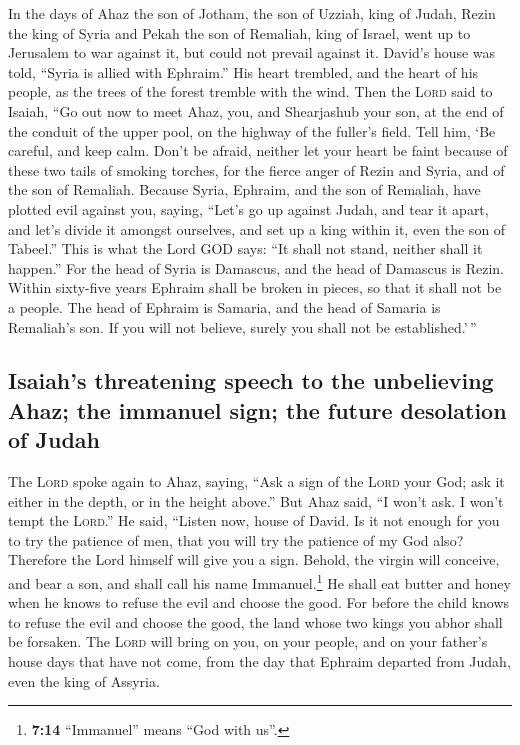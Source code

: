  In the days of Ahaz the son of Jotham, the son of Uzziah,
king of Judah, Rezin the king of Syria and Pekah the son of Remaliah,
king of Israel, went up to Jerusalem to war against it, but could not
prevail against it.  David's house was told, ``Syria is
allied with Ephraim.'' His heart trembled, and the heart of his people,
as the trees of the forest tremble with the wind.  Then
the \textsc{Lord} said to Isaiah, ``Go out now to meet Ahaz, you, and
Shearjashub your son, at the end of the conduit of the upper pool, on
the highway of the fuller's field.  Tell him, `Be careful,
and keep calm. Don't be afraid, neither let your heart be faint because
of these two tails of smoking torches, for the fierce anger of Rezin and
Syria, and of the son of Remaliah.  Because Syria,
Ephraim, and the son of Remaliah, have plotted evil against you, saying,
 ``Let's go up against Judah, and tear it apart, and let's
divide it amongst ourselves, and set up a king within it, even the son
of Tabeel.''  This is what the Lord GOD says: ``It shall
not stand, neither shall it happen.''  For the head of
Syria is Damascus, and the head of Damascus is Rezin. Within sixty-five
years Ephraim shall be broken in pieces, so that it shall not be a
people.  The head of Ephraim is Samaria, and the head of
Samaria is Remaliah's son. If you will not believe, surely you shall not
be established.'\,''

\hypertarget{isaiahs-threatening-speech-to-the-unbelieving-ahaz-the-immanuel-sign-the-future-desolation-of-judah}{%
\subsection{Isaiah's threatening speech to the unbelieving Ahaz; the
immanuel sign; the future desolation of
Judah}\label{isaiahs-threatening-speech-to-the-unbelieving-ahaz-the-immanuel-sign-the-future-desolation-of-judah}}

 The \textsc{Lord} spoke again to Ahaz, saying,
 ``Ask a sign of the \textsc{Lord} your God; ask it
either in the depth, or in the height above.''  But Ahaz
said, ``I won't ask. I won't tempt the \textsc{Lord}.'' 
He said, ``Listen now, house of David. Is it not enough for you to try
the patience of men, that you will try the patience of my God also?
 Therefore the Lord himself will give you a sign. Behold,
the virgin will conceive, and bear a son, and shall call his name
Immanuel.\footnote{\textbf{7:14} ``Immanuel'' means ``God with us''.}
 He shall eat butter and honey when he knows to refuse
the evil and choose the good.  For before the child knows
to refuse the evil and choose the good, the land whose two kings you
abhor shall be forsaken.  The \textsc{Lord} will bring on
you, on your people, and on your father's house days that have not come,
from the day that Ephraim departed from Judah, even the king of Assyria.

